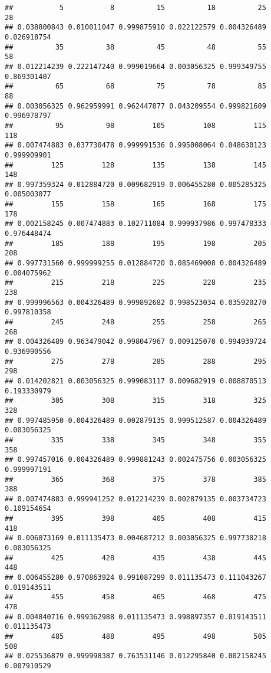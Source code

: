 \documentclass[
]{article}
\begin{document}
\begin{verbatim}
##           5           8          15          18          25          28 
## 0.038800843 0.010011047 0.999875910 0.022122579 0.004326489 0.026918754 
##          35          38          45          48          55          58 
## 0.012214239 0.222147240 0.999019664 0.003056325 0.999349755 0.869301407 
##          65          68          75          78          85          88 
## 0.003056325 0.962959991 0.962447877 0.043209554 0.999821609 0.996978797 
##          95          98         105         108         115         118 
## 0.007474883 0.037730478 0.999991536 0.995008064 0.048630123 0.999909901 
##         125         128         135         138         145         148 
## 0.997359324 0.012884720 0.009682919 0.006455280 0.005285325 0.005003077 
##         155         158         165         168         175         178 
## 0.002158245 0.007474883 0.102711084 0.999937986 0.997478333 0.976448474 
##         185         188         195         198         205         208 
## 0.997731560 0.999999255 0.012884720 0.085469008 0.004326489 0.004075962 
##         215         218         225         228         235         238 
## 0.999996563 0.004326489 0.999892682 0.998523034 0.035920270 0.997810358 
##         245         248         255         258         265         268 
## 0.004326489 0.963479042 0.998047967 0.009125070 0.994939724 0.936990556 
##         275         278         285         288         295         298 
## 0.014202821 0.003056325 0.999083117 0.009682919 0.008870513 0.193330979 
##         305         308         315         318         325         328 
## 0.997485950 0.004326489 0.002879135 0.999512587 0.004326489 0.003056325 
##         335         338         345         348         355         358 
## 0.997457016 0.004326489 0.999881243 0.002475756 0.003056325 0.999997191 
##         365         368         375         378         385         388 
## 0.007474883 0.999941252 0.012214239 0.002879135 0.003734723 0.109154654 
##         395         398         405         408         415         418 
## 0.006073169 0.011135473 0.004687212 0.003056325 0.997738218 0.003056325 
##         425         428         435         438         445         448 
## 0.006455280 0.970863924 0.991087299 0.011135473 0.111043267 0.019143511 
##         455         458         465         468         475         478 
## 0.004840716 0.999362988 0.011135473 0.998897357 0.019143511 0.011135473 
##         485         488         495         498         505         508 
## 0.025536879 0.999998387 0.763531146 0.012295840 0.002158245 0.007910529 

\end{verbatim}
\end{document}
